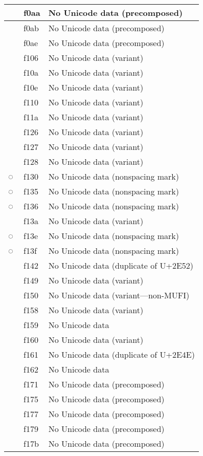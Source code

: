 \documentclass[12pt,letterpaper,openany]{book}
\begin{document}
\begin{center}
\begin{supertabular}{|m{0.25in}|m{0.5in}|m{4in}|}
 & f0aa & No Unicode data (precomposed)\\\hline
 & f0ab & No Unicode data (precomposed)\\\hline
 & f0ae & No Unicode data (precomposed)\\\hline
 & f106 & No Unicode data (variant)\\\hline
 & f10a & No Unicode data (variant)\\\hline
 & f10e & No Unicode data (variant)\\\hline
 & f110 & No Unicode data (variant)\\\hline
 & f11a & No Unicode data (variant)\\\hline
 & f126 & No Unicode data (variant)\\\hline
 & f127 & No Unicode data (variant)\\\hline
 & f128 & No Unicode data (variant)\\\hline
◌ & f130 & No Unicode data (nonspacing mark)\\\hline
◌ & f135 & No Unicode data (nonspacing mark)\\\hline
◌ & f136 & No Unicode data (nonspacing mark)\\\hline
 & f13a & No Unicode data (variant)\\\hline
◌ & f13e & No Unicode data (nonspacing mark)\\\hline
◌ & f13f & No Unicode data (nonspacing mark)\\\hline
 & f142 & No Unicode data (duplicate of U+2E52)\\\hline
 & f149 & No Unicode data (variant)\\\hline
 & f150 & No Unicode data (variant---non-MUFI)\\\hline
 & f158 & No Unicode data (variant)\\\hline
 & f159 & No Unicode data\\\hline
 & f160 & No Unicode data (variant)\\\hline
 & f161 & No Unicode data (duplicate of U+2E4E)\\\hline
 & f162 & No Unicode data\\\hline
 & f171 & No Unicode data (precomposed)\\\hline
 & f175 & No Unicode data (precomposed)\\\hline
 & f177 & No Unicode data (precomposed)\\\hline
 & f179 & No Unicode data (precomposed)\\\hline
 & f17b & No Unicode data (precomposed)\\\hline

\end{supertabular}
\end{center}
\end{document}
